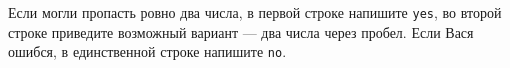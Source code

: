 Если могли пропасть ровно два числа, в первой строке напишите \texttt{yes},
во второй строке приведите возможный вариант --- два числа через пробел.
Если Вася ошибся, в единственной строке напишите \texttt{no}.